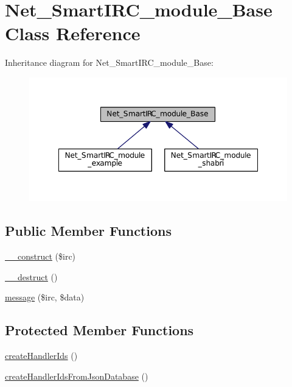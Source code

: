 \hypertarget{classNet__SmartIRC__module__Base}{}\section{Net\+\_\+\+Smart\+I\+R\+C\+\_\+module\+\_\+\+Base Class Reference}
\label{classNet__SmartIRC__module__Base}


Inheritance diagram for Net\+\_\+\+Smart\+I\+R\+C\+\_\+module\+\_\+\+Base\+:
\nopagebreak
\begin{figure}[H]
\begin{center}
\leavevmode
\includegraphics[width=348pt]{d3/dbe/classNet__SmartIRC__module__Base__inherit__graph}
\end{center}
\end{figure}
\subsection*{Public Member Functions}
\begin{DoxyCompactItemize}
\item 
\hyperlink{classNet__SmartIRC__module__Base_a169a92d17ca3a8b450c882d5886bfa92}{\+\_\+\+\_\+construct} (\$irc)
\item 
\hyperlink{classNet__SmartIRC__module__Base_a782457b9a8a4b6ee1eb93d73ec685f90}{\+\_\+\+\_\+destruct} ()
\item 
\hyperlink{classNet__SmartIRC__module__Base_a78e6239431e5adb5b9308dbe6bc3e372}{message} (\$irc, \$data)
\end{DoxyCompactItemize}
\subsection*{Protected Member Functions}
\begin{DoxyCompactItemize}
\item 
\hyperlink{classNet__SmartIRC__module__Base_a00916f9449f381c434de68967cc493e3}{create\+Handler\+Ids} ()
\item 
\hyperlink{classNet__SmartIRC__module__Base_ae7a2d04989f59e5bd45f7835e6904900}{create\+Handler\+Ids\+From\+Json\+Database} ()
\end{DoxyCompactItemize}
